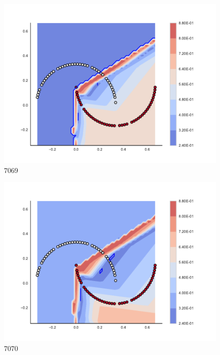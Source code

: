 \begin{subfigure}[b]{0.09\textwidth}
    \includegraphics[clip, trim=2.35cm 1.75cm 4.5cm 0cm,width=\textwidth]{img/convergence/7069.pdf}
    \caption{7069}
    \label{fig:convergence_7069}
\end{subfigure}
%
\begin{subfigure}[b]{0.09\textwidth}
    \includegraphics[clip, trim=2.35cm 1.75cm 4.5cm 0cm,width=\textwidth]{img/convergence/7070.pdf}
    \caption{7070}
    \label{fig:convergence_7070}
\end{subfigure}
%
